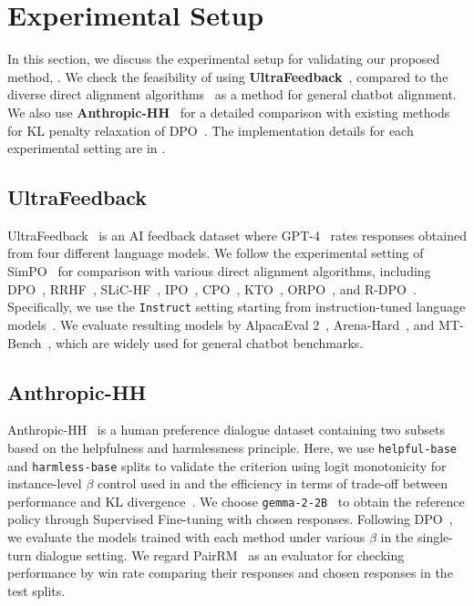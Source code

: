 \section{Experimental Setup}

In this section, we discuss the experimental setup for validating our proposed method, \method{}. We check the feasibility of \method{} using \textbf{UltraFeedback}~\cite{cui2023ultrafeedback}, compared to the diverse direct alignment algorithms~\cite{rafailov2023direct, yuan2023rrhf, zhao2023slic, azar2024general, xu2024contrastive, ethayarajh2024kto, hong2024orpo, park2024disentangling, meng2024simpo} as a method for general chatbot alignment. We also use \textbf{Anthropic-HH}~\cite{bai2022training} for a detailed comparison with existing methods for KL penalty relaxation of DPO~\cite{wu2024beta, gorbatovski2024learn}. The implementation details for each experimental setting are in .

\subsection{UltraFeedback}

UltraFeedback~\cite{cui2023ultrafeedback} is an AI feedback dataset where GPT-4~\cite{achiam2023gpt} rates responses obtained from four different language models. We follow the experimental setting of SimPO~\cite{meng2024simpo} for comparison with various direct alignment algorithms, including DPO~\cite{rafailov2023direct}, RRHF~\cite{yuan2023rrhf}, SLiC-HF~\cite{zhao2023slic}, IPO~\cite{azar2024general}, CPO~\cite{xu2024contrastive}, KTO~\cite{ethayarajh2024kto}, ORPO~\cite{hong2024orpo}, and R-DPO~\cite{park2024disentangling}. Specifically, we use the \texttt{Instruct} setting starting from instruction-tuned language models~\cite{jiang2023mistral, dubey2024llama}. We evaluate resulting models by AlpacaEval 2~\cite{dubois2024length}, Arena-Hard~\cite{li2024crowdsourced}, and MT-Bench~\cite{jiang2023llm}, which are widely used for general chatbot benchmarks. 

\subsection{Anthropic-HH}

Anthropic-HH~\cite{bai2022training} is a human preference dialogue dataset containing two subsets based on the helpfulness and harmlessness principle. Here, we use \texttt{helpful-base} and \texttt{harmless-base} splits to validate the criterion using logit monotonicity for instance-level $\beta$ control used in \method{} and the efficiency in terms of trade-off between performance and KL divergence~\cite{rafailov2024scaling}. We choose \texttt{gemma-2-2B}~\cite{team2024gemma} to obtain the reference policy through Supervised Fine-tuning with chosen responses. Following DPO~\cite{rafailov2023direct}, we evaluate the models trained with each method under various $\beta$ in the single-turn dialogue setting. We regard PairRM~\cite{jiang2023llm} as an evaluator for checking performance by win rate comparing their responses and chosen responses in the test splits.
